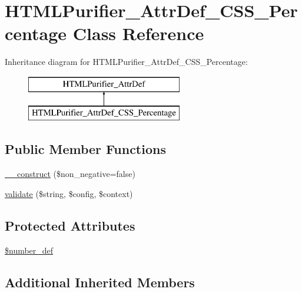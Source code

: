 \hypertarget{classHTMLPurifier__AttrDef__CSS__Percentage}{\section{H\+T\+M\+L\+Purifier\+\_\+\+Attr\+Def\+\_\+\+C\+S\+S\+\_\+\+Percentage Class Reference}
\label{classHTMLPurifier__AttrDef__CSS__Percentage}
}
Inheritance diagram for H\+T\+M\+L\+Purifier\+\_\+\+Attr\+Def\+\_\+\+C\+S\+S\+\_\+\+Percentage\+:\begin{figure}[H]
\begin{center}
\leavevmode
\includegraphics[height=2.000000cm]{classHTMLPurifier__AttrDef__CSS__Percentage}
\end{center}
\end{figure}
\subsection*{Public Member Functions}
\begin{DoxyCompactItemize}
\item 
\hyperlink{classHTMLPurifier__AttrDef__CSS__Percentage_a498fa9fa27a91bb33410fe9a529d4175}{\+\_\+\+\_\+construct} (\$non\+\_\+negative=false)
\item 
\hyperlink{classHTMLPurifier__AttrDef__CSS__Percentage_a829a101293ed4b8ba023fee78a317998}{validate} (\$string, \$config, \$context)
\end{DoxyCompactItemize}
\subsection*{Protected Attributes}
\begin{DoxyCompactItemize}
\item 
\hyperlink{classHTMLPurifier__AttrDef__CSS__Percentage_a8a4534be853d98f7417921581dacc4c0}{\$number\+\_\+def}
\end{DoxyCompactItemize}
\subsection*{Additional Inherited Members}


